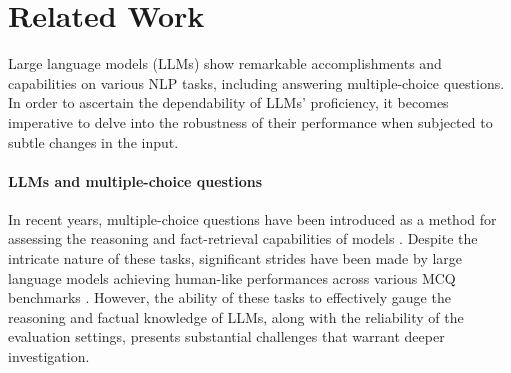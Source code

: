 \documentclass[11pt]{article}
\begin{document}
\section{Related Work}
Large language models (LLMs) show remarkable accomplishments and capabilities on various NLP tasks, including answering multiple-choice questions. 
In order to ascertain the dependability of LLMs' proficiency, it becomes imperative to delve into the robustness of their performance when subjected to subtle changes in the input.

\paragraph{LLMs and multiple-choice questions}  
In recent years, multiple-choice questions have been introduced as a method for assessing the reasoning and fact-retrieval capabilities of models \citep{richardson2013mctest,talmor2018commonsenseqa,clark2020f,hendrycks2020measuring}. Despite the intricate nature of these tasks, significant strides have been made by large language models achieving human-like performances across various MCQ benchmarks \cite{lievin2022can,robinson2022leveraging,openai2023gpt-4,savelka2023large,anil2023palm}. 
However, the ability of these tasks to effectively gauge the reasoning and factual knowledge of LLMs, along with the reliability of the evaluation settings, presents substantial challenges that warrant deeper investigation.
\end{document}

